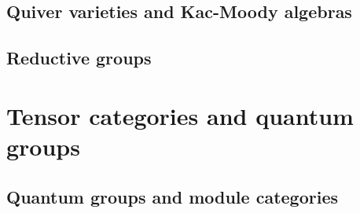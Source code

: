         \chapter{Quiver varieties and Kac-Moody algebras}
            \begin{abstract}
                
            \end{abstract}
            
            \minitoc
            
            
            
            
            
            
            
        \begin{appendices}
            \chapter{Reductive groups}
                \begin{abstract}
                    
                \end{abstract}
                
                \minitoc
                
                
            
                
                
                
                
                
                
                
        \end{appendices}
    
    \part{Tensor categories and quantum groups}
        \chapter{Quantum groups and module categories}
            \begin{abstract}
                
            \end{abstract}
            

